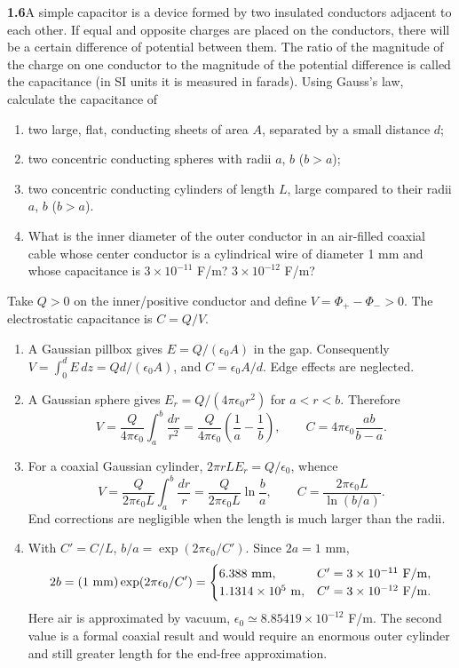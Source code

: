 \par\bigskip
\noindent\textbf{1.6}\quad A simple capacitor is a device formed by two insulated conductors adjacent to each other. If equal and opposite charges are placed on the conductors, there will be a certain difference of potential between them. The ratio of the magnitude of the charge on one conductor to the magnitude of the potential difference is called the capacitance (in SI units it is measured in farads). Using Gauss's law, calculate the capacitance of
\begin{enumerate}
\item[(a)] two large, flat, conducting sheets of area $A$, separated by a small distance $d$;
\item[(b)] two concentric conducting spheres with radii $a$, $b$ ($b>a$);
\item[(c)] two concentric conducting cylinders of length $L$, large compared to their radii $a$, $b$ ($b>a$).
\item[(d)] What is the inner diameter of the outer conductor in an air-filled coaxial cable whose center conductor is a cylindrical wire of diameter 1 mm and whose capacitance is $3\times10^{-11}$ F/m? $3\times10^{-12}$ F/m?
\end{enumerate}
\solution
Take $Q>0$ on the inner/positive conductor and define
$V=\Phi_+-\Phi_->0$. The electrostatic capacitance is $C=Q/V$.
\begin{enumerate}
\item[(a)] A Gaussian pillbox gives $E=Q/(\epsilon_0 A)$ in the gap.
Consequently $V=\int_0^d E\,dz=Qd/(\epsilon_0A)$, and
$\boxed{C=\epsilon_0A/d}$. Edge effects are neglected.
\item[(b)] A Gaussian sphere gives $E_r=Q/(4\pi\epsilon_0r^2)$ for $a<r<b$.
Therefore
\[
V=\frac{Q}{4\pi\epsilon_0}\int_a^b\frac{dr}{r^2}
=\frac{Q}{4\pi\epsilon_0}\left(\frac1a-\frac1b\right),\qquad
\boxed{C=4\pi\epsilon_0\frac{ab}{b-a}}.
\]
\item[(c)] For a coaxial Gaussian cylinder,
$2\pi rLE_r=Q/\epsilon_0$, whence
\[
V=\frac{Q}{2\pi\epsilon_0L}\int_a^b\frac{dr}{r}
=\frac{Q}{2\pi\epsilon_0L}\ln\frac ba,\qquad
\boxed{C=\frac{2\pi\epsilon_0L}{\ln(b/a)}}.
\]
End corrections are negligible when the length is much larger than the radii.
\item[(d)] With $C'=C/L$, $b/a=\exp(2\pi\epsilon_0/C')$. Since $2a=1$ mm,
\[
2b=(1\ {\rm mm})\exp(2\pi\epsilon_0/C')
=\begin{cases}
6.388\ {\rm mm},&C'=3\times10^{-11}\ {\rm F/m},\\
1.1314\times10^5\ {\rm m},&C'=3\times10^{-12}\ {\rm F/m}.
\end{cases}
\]
Here air is approximated by vacuum, $\epsilon_0\simeq8.85419\times10^{-12}$ F/m.
The second value is a formal coaxial result and would require an enormous
outer cylinder and still greater length for the end-free approximation.
\end{enumerate}


